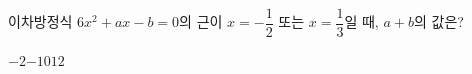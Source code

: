 이차방정식 $6x^2+ax-b=0$의 근이 $x=-\dfrac{1}{2}$ 또는 $x=\dfrac{1}{3}$일 때, $a+b$의 값은? 
\begin{choices32}{$-2$}{$-1$}{$0$}{$1$}{$2$}\end{choices32}
